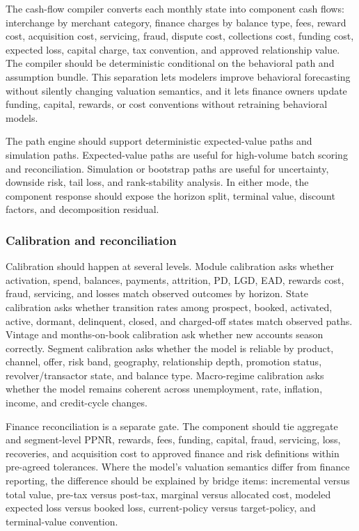 \documentclass[11pt]{article}
\newcommand{\1}{\mathbf{1}}
\begin{document}
The cash-flow compiler converts each monthly state into component cash flows:
interchange by merchant category, finance charges by balance type, fees,
reward cost, acquisition cost, servicing, fraud, dispute cost, collections
cost, funding cost, expected loss, capital charge, tax convention, and
approved relationship value. The compiler should be deterministic conditional
on the behavioral path and assumption bundle. This separation lets modelers
improve behavioral forecasting without silently changing valuation semantics,
and it lets finance owners update funding, capital, rewards, or cost
conventions without retraining behavioral models.

The path engine should support deterministic expected-value paths and
simulation paths. Expected-value paths are useful for high-volume batch
scoring and reconciliation. Simulation or bootstrap paths are useful for
uncertainty, downside risk, tail loss, and rank-stability analysis. In either
mode, the component response should expose the horizon split, terminal value,
discount factors, and decomposition residual.

\subsubsection{Calibration and reconciliation}
\label{subsec:calibration-reconciliation}

Calibration should happen at several levels. Module calibration asks whether
activation, spend, balances, payments, attrition, PD, LGD, EAD, rewards cost,
fraud, servicing, and losses match observed outcomes by horizon. State
calibration asks whether transition rates among prospect, booked, activated,
active, dormant, delinquent, closed, and charged-off states match observed
paths. Vintage and months-on-book calibration ask whether new accounts season
correctly. Segment calibration asks whether the model is reliable by product,
channel, offer, risk band, geography, relationship depth, promotion status,
revolver/transactor state, and balance type. Macro-regime calibration asks
whether the model remains coherent across unemployment, rate, inflation,
income, and credit-cycle changes.

Finance reconciliation is a separate gate. The component should tie aggregate
and segment-level PPNR, rewards, fees, funding, capital, fraud, servicing,
loss, recoveries, and acquisition cost to approved finance and risk definitions
within pre-agreed tolerances. Where the model's valuation semantics differ
from finance reporting, the difference should be explained by bridge items:
incremental versus total value, pre-tax versus post-tax, marginal versus
allocated cost, modeled expected loss versus booked loss, current-policy versus
target-policy, and terminal-value convention.
\end{document}
